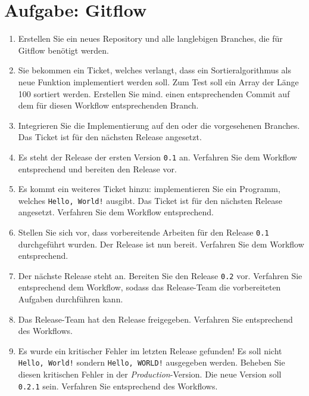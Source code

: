 
\section{Aufgabe: Gitflow}
\label{sec:task:gitflow}

\begin{enumerate}
    \item Erstellen Sie ein neues Repository und alle langlebigen Branches, die für Gitflow benötigt werden.
    
    \item Sie bekommen ein Ticket, welches verlangt, dass ein Sortieralgorithmus als neue Funktion implementiert werden soll. Zum Test soll ein Array der Länge 100 sortiert werden. Erstellen Sie mind. einen entsprechenden Commit auf dem für diesen Workflow entsprechenden Branch.
    
    \item Integrieren Sie die Implementierung auf den oder die vorgesehenen Branches. Das Ticket ist für den nächsten Release angesetzt.
    
    \item Es steht der Release der ersten Version \verb|0.1| an. Verfahren Sie dem Workflow entsprechend und bereiten den Release vor.
    
    \item Es kommt ein weiteres Ticket hinzu: implementieren Sie ein Programm, welches \verb|Hello, World!| ausgibt. Das Ticket ist für den nächsten Release angesetzt. Verfahren Sie dem Workflow entsprechend.
    
    \item Stellen Sie sich vor, dass vorbereitende Arbeiten für den Release \verb|0.1| durchgeführt wurden. Der Release ist nun bereit. Verfahren Sie dem Workflow entsprechend.
    
    \item Der nächste Release steht an. Bereiten Sie den Release \verb|0.2| vor. Verfahren Sie entsprechend dem Workflow, sodass das Release\hyp Team die vorbereiteten Aufgaben durchführen kann.
    
    \item Das Release\hyp Team hat den Release freigegeben. Verfahren Sie entsprechend des Workflows.
    
    \item Es wurde ein kritischer Fehler im letzten Release gefunden! Es soll nicht \verb|Hello, World!| sondern \verb|Hello, WORLD!| ausgegeben werden. Beheben Sie diesen kritischen Fehler in der \emph{Production}-Version. Die neue Version soll \verb|0.2.1| sein. Verfahren Sie entsprechend des Workflows.
\end{enumerate}
